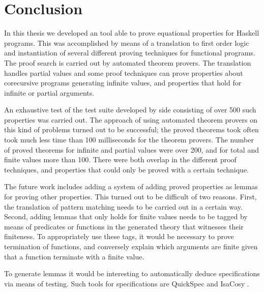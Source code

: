 \chapter{Conclusion}
\label{ch:conclusion}

In this thesis we developed an tool able to prove equational
properties for Haskell programs. This was accomplished by means of a
translation to first order logic and instantiation of several
different proving techniques for functional programs. The proof search
is carried out by automated theorem provers. The translation handles
partial values and some proof techniques can prove properties about
corecursive programs generating infinite values, and properties that
hold for infinite or partial arguments.

An exhaustive test of the test suite developed by side consisting of
over 500 such properties was carried out. The approach of using
automated theorem provers on this kind of problems turned out to be
successful; the proved theorems took often took much less time than
100 milliseconds for the theorem provers. The number of proved
theorems for infinite and partial values were over 200, and for total
and finite values more than 100. There were both overlap in the
different proof techniques, and properties that could only be proved
with a certain technique.

The future work includes adding a system of adding proved properties
as lemmas for proving other properties. This turned out to be
difficult of two reasons. First, the translation of pattern matching
needs to be carried out in a certain way. Second, adding lemmas that
only holds for finite values needs to be tagged by means of predicates
or functions in the generated theory that witnesses their
finiteness. To appropriately use these tags, it would be necessary to
prove termination of functions, and conversely explain which arguments
are finite given that a function terminate with a finite value.

To generate lemmas it would be interesting to automatically deduce
specifications via means of testing. Such tools for specifications are
QuickSpec \citep{quickspec} and IsaCosy \citep{isacosy}.
